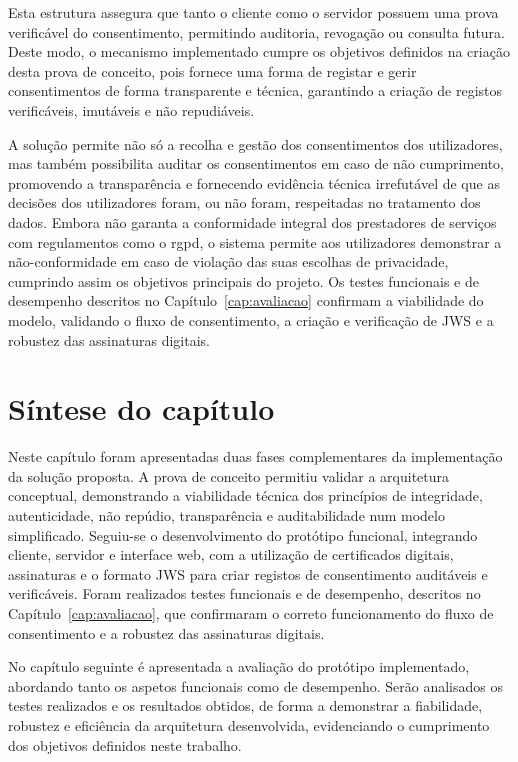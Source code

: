 Esta estrutura assegura que tanto o cliente como o servidor possuem uma prova verificável do consentimento, permitindo auditoria, revogação ou consulta futura. Deste modo, o mecanismo implementado cumpre os objetivos definidos na criação desta prova de conceito, pois fornece uma forma de registar e gerir consentimentos de forma transparente e técnica, garantindo a criação de registos verificáveis, imutáveis e não repudiáveis.

A solução permite não só a recolha e gestão dos consentimentos dos utilizadores, mas também possibilita auditar os consentimentos em caso de não cumprimento, promovendo a transparência e fornecendo evidência técnica irrefutável de que as decisões dos utilizadores foram, ou não foram, respeitadas no tratamento dos dados. Embora não garanta a conformidade integral dos prestadores de serviços com regulamentos como o \acrshort{rgpd}, o sistema permite aos utilizadores demonstrar a não-conformidade em caso de violação das suas escolhas de privacidade, cumprindo assim os objetivos principais do projeto. Os testes funcionais e de desempenho descritos no Capítulo~\ref{cap:avaliacao} confirmam a viabilidade do modelo, validando o fluxo de consentimento, a criação e verificação de JWS e a robustez das assinaturas digitais.

\section{Síntese do capítulo}

Neste capítulo foram apresentadas duas fases complementares da implementação da solução proposta. A prova de conceito permitiu validar a arquitetura conceptual, demonstrando a viabilidade técnica dos princípios de integridade, autenticidade, não repúdio, transparência e auditabilidade num modelo simplificado. Seguiu-se o desenvolvimento do protótipo funcional, integrando cliente, servidor e interface web, com a utilização de certificados digitais, assinaturas e o formato JWS para criar registos de consentimento auditáveis e verificáveis. Foram realizados testes funcionais e de desempenho, descritos no Capítulo~\ref{cap:avaliacao}, que confirmaram o correto funcionamento do fluxo de consentimento e a robustez das assinaturas digitais.  

No capítulo seguinte é apresentada a avaliação do protótipo implementado, abordando tanto os aspetos funcionais como de desempenho. Serão analisados os testes realizados e os resultados obtidos, de forma a demonstrar a fiabilidade, robustez e eficiência da arquitetura desenvolvida, evidenciando o cumprimento dos objetivos definidos neste trabalho.
